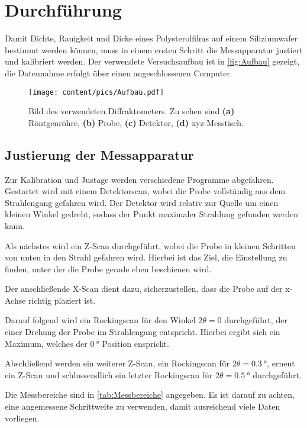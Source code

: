 \section{Durchführung}
\label{sec:Durchführung}
Damit Dichte, Rauigkeit und Dicke eines Polysterolfilms auf einem Siliziumwafer bestimmt werden können, muss in einem ersten Schritt die Messapparatur
justiert und kalibriert werden.
Der verwendete Versuchsaufbau ist in \autoref{fig:Aufbau} gezeigt, die Datennahme erfolgt über einen angeschlossenen Computer.

\begin{figure}
    \centering
    \texttt{[image: content/pics/Aufbau.pdf]}
    \caption{Bild des verwendeten Diffraktometers. Zu sehen sind \textbf{(a)} Röntgenröhre, \textbf{(b)} Probe, \textbf{(c)} Detektor, \textbf{(d)} xyz-Messtisch.}
    \label{fig:Aufbau}
\end{figure}

\subsection{Justierung der Messapparatur}
Zur Kalibration und Justage werden verschiedene Programme abgefahren. Gestartet wird mit einem Detektorscan, wobei die Probe vollständig aus dem Strahlengang
gefahren wird. Der Detektor wird relativ zur Quelle um einen kleinen Winkel gedreht, sodass der Punkt maximaler Strahlung gefunden werden kann.

Als nächstes wird ein Z-Scan durchgeführt, wobei die Probe in kleinen Schritten von unten in den Strahl gefahren wird. Hierbei ist das Ziel, die Einstellung
zu finden, unter der die Probe gerade eben beschienen wird.

Der anschließende X-Scan dient dazu, sicherzustellen, dass die Probe auf der x-Achse richtig plaziert ist.

Darauf folgend wird ein Rockingscan für den Winkel $2\theta = 0$ durchgeführt, der einer Drehung der Probe im Strahlengang entspricht. Hierbei ergibt sich ein Maximum, welches 
der $\qty{0}{\degree}$ Position enspricht.

Abschließend werden ein weiterer Z-Scan, ein Rockingscan für $2\theta = \qty{0.3}{\degree}$, erneut ein Z-Scan und schlussendlich ein letzter Rockingscan für $2\theta = \qty{0.5}{\degree}$ durchgeführt.

Die Messbereiche sind in \autoref{tab:Messbereiche} angegeben. Es ist darauf zu achten, eine angemessene Schrittweite zu verwenden, damit ausreichend viele Daten
vorliegen.

